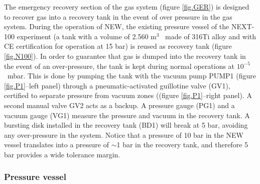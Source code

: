 The emergency recovery section of the gas system (figure \ref{fig.GER}) is designed to recover gas into a recovery tank in the event of over pressure in the gas system. During the operation of NEW, the existing pressure vessel of the NEXT-100 experiment (a tank with a volume of 2.560 m$^3$~ made of 316Ti alloy and with CE certification for operation at 15 bar) is reused as recovery tank (figure \ref{fig.N100}). In order to guarantee that gas is dumped into the recovery tank in the event of an over-pressure, the tank is kept during normal operations at $10^{-5}$~mbar. This is done by pumping the tank with the vacuum pump PUMP1 (figure \ref{fig.P1}--left panel)
through a pneumatic-activated guillotine valve (GV1), certified to separate pressure from 
vacuum zones ((figure \ref{fig.P1}--right panel). A second  manual valve GV2 acts as a backup. A pressure gauge (PG1) and a vacuum gauge (VG1) measure the pressure and vacuum in the recovery tank. A bursting disk installed in the recovery tank (BD1) will break at 5 bar, avoiding any over-pressure in the system. Notice that a pressure of 10 bar in the NEW vessel translates into a pressure of $\sim$1 bar in the recovery tank, and therefore 5 bar provides a wide tolerance margin.   


\subsubsection*{Pressure vessel}

